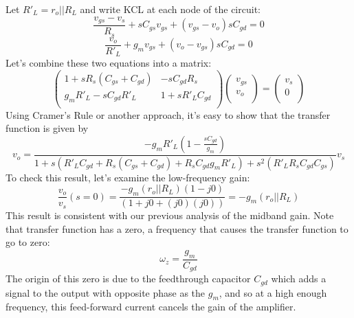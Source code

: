Let $R'_L = r_o || R_L$ and write KCL at each node of the circuit:
%
\begin{equation}
	\frac{v_{gs} - v_s}{R_s} + s C_{gs} v_{gs} + (v_{gs} - v_o) s C_{gd} = 0
\end{equation}
%
\begin{equation}
	\frac{v_o}{R'_L} + g_m v_{gs} + (v_o - v_{gs}) s C_{gd} = 0 
\end{equation}
%
Let's combine these two equations into a matrix:
%
\begin{equation}
	\begin{pmatrix}
	1 + s R_s (C_{gs} + C_{gd}) & -s C_{gd} R_s \\
	g_m R'_L - s C_{gd} R'_L & 1 + s R'_L C_{gd}  \\
	\end{pmatrix}
	 \begin{pmatrix}
		v_{gs} \\ v_o \\
	\end{pmatrix} 	
	=
	 \begin{pmatrix}
		v_s \\ 0 \\
	\end{pmatrix} 
\end{equation}
%
Using Cramer's Rule or another approach, it's easy to show that the transfer function is given by
%
\begin{equation}
	v_o = \frac{-g_m R'_L (1 - \frac{s C_{gd}}{g_m})}
	{1 + s \left( R'_L C_{gd} + R_s (C_{gs} + C_{gd}) + R_s C_{gd} g_m R'_L \right) 
	+ s^2 (R'_L R_s C_{gd} C_{gs}) } v_s
\label{eq:exact_transfer}
\end{equation}
To check this result, let's examine the low-frequency gain:
%
\begin{equation}
\frac{{{v_{o}}}}{{{v_{s}}}}(s = 0) = \frac{{ - {g_m}\left( {{r_o}||{R_L}} \right)\left( {1 - j0} \right)}}{{\left( {1 + j0 + (j0)(j0)} \right) }} =  - {g_m}\left( {{r_o}||{R_L}} \right)
\end{equation}
This result is consistent with our previous analysis of the midband gain.  Note that transfer function has a zero, a frequency that causes the transfer function to go to zero:
%
\begin{equation} 
	{\omega_z} = \frac{g_m}{C_{gd}}
\end{equation}
%
The origin of this zero is due to the feedthrough capacitor $C_{gd}$ which adds a signal to the output with opposite phase as the $g_m$, and so at a high enough frequency, this feed-forward current cancels the gain of the amplifier.
%

